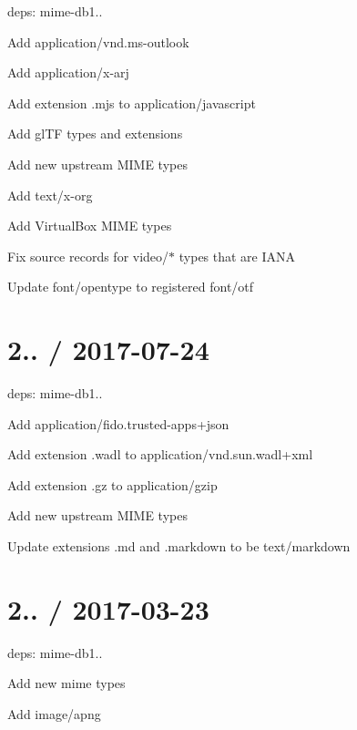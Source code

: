 \begin{DoxyItemize}
\item deps\+: mime-\/db1..
\begin{DoxyItemize}
\item Add {\ttfamily application/vnd.\+ms-\/outlook}
\item Add {\ttfamily application/x-\/arj}
\item Add extension {\ttfamily .mjs} to {\ttfamily application/javascript}
\item Add gl\+TF types and extensions
\item Add new upstream M\+I\+ME types
\item Add {\ttfamily text/x-\/org}
\item Add Virtual\+Box M\+I\+ME types
\item Fix {\ttfamily source} records for {\ttfamily video/$\ast$} types that are I\+A\+NA
\item Update {\ttfamily font/opentype} to registered {\ttfamily font/otf}
\end{DoxyItemize}
\end{DoxyItemize}

\section*{2.. / 2017-\/07-\/24 }


\begin{DoxyItemize}
\item deps\+: mime-\/db1..
\begin{DoxyItemize}
\item Add {\ttfamily application/fido.\+trusted-\/apps+json}
\item Add extension {\ttfamily .wadl} to {\ttfamily application/vnd.\+sun.\+wadl+xml}
\item Add extension {\ttfamily .gz} to {\ttfamily application/gzip}
\item Add new upstream M\+I\+ME types
\item Update extensions {\ttfamily .md} and {\ttfamily .markdown} to be {\ttfamily text/markdown}
\end{DoxyItemize}
\end{DoxyItemize}

\section*{2.. / 2017-\/03-\/23 }


\begin{DoxyItemize}
\item deps\+: mime-\/db1..
\begin{DoxyItemize}
\item Add new mime types
\item Add {\ttfamily image/apng}
\end{DoxyItemize}
\end{DoxyItemize}

